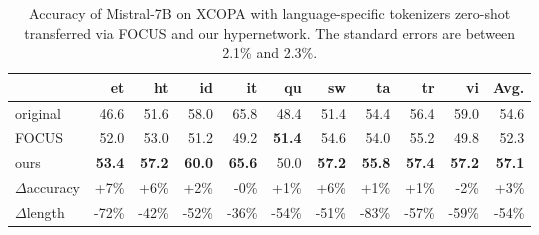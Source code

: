 \begin{table}[!t]
\caption{Accuracy of Mistral-7B on XCOPA with language-specific tokenizers zero-shot transferred via FOCUS and our hypernetwork. The standard errors are between 2.1\% and 2.3\%.}
\centering
\small
\setlength\tabcolsep{3pt}
\begin{tabularx}{\linewidth}{lRRRRRRRRRR}
\toprule
& \textbf{et} & \textbf{ht} & \textbf{id} & \textbf{it} & \textbf{qu} & \textbf{sw} & \textbf{ta} & \textbf{tr} & \textbf{vi} & \textbf{Avg.} \\
\midrule
{} original & 46.6 & 51.6 & 58.0 & 65.8 & 48.4 & 51.4 & 54.4 & 56.4 & 59.0 & 54.6\\
\midrule
FOCUS & 52.0 & 53.0 & 51.2 & 49.2 & \textbf{51.4} & 54.6 & 54.0 & 55.2 & 49.8 & 52.3\\
ours & \textbf{53.4} & \textbf{57.2} & \textbf{60.0} & \textbf{65.6} & 50.0 & \textbf{57.2} & \textbf{55.8} & \textbf{57.4} & \textbf{57.2} & \textbf{57.1}\\
\midrule
$\Delta$accuracy & \textcolor{JungleGreen}{+7\%} & \textcolor{JungleGreen}{+6\%} & \textcolor{JungleGreen}{+2\%} & \textcolor{BrickRed}{-0\%} & \textcolor{JungleGreen}{+1\%} & \textcolor{JungleGreen}{+6\%} & \textcolor{JungleGreen}{+1\%} & \textcolor{JungleGreen}{+1\%} & \textcolor{BrickRed}{-2\%} & \textcolor{JungleGreen}{+3\%}\\
$\Delta$length & \textcolor{JungleGreen}{-72\%} & \textcolor{JungleGreen}{-42\%} & \textcolor{JungleGreen}{-52\%} & \textcolor{JungleGreen}{-36\%} & \textcolor{JungleGreen}{-54\%} & \textcolor{JungleGreen}{-51\%} & \textcolor{JungleGreen}{-83\%} & \textcolor{JungleGreen}{-57\%} & \textcolor{JungleGreen}{-59\%} & \textcolor{JungleGreen}{-54\%}\\
\bottomrule
\end{tabularx}
\label{table:multilingual}
\end{table}